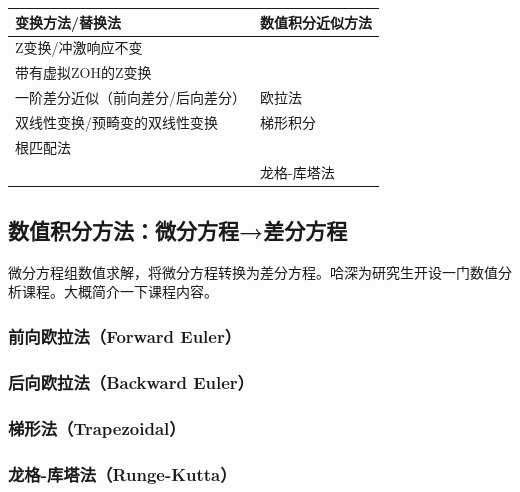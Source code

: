 \documentclass[
  12pt,
  a4paper
]{article}
\begin{document}
\begin{longtable}[]{@{}
  >{\centering\arraybackslash}p{}
  >{\centering\arraybackslash}p{}@{}}
\toprule\noalign{}
\begin{minipage}[b]{\linewidth}\centering
\textbf{变换方法/替换法}
\end{minipage} & \begin{minipage}[b]{\linewidth}\centering
\textbf{数值积分近似方法}
\end{minipage} \\
\midrule\noalign{}
\endhead
\bottomrule\noalign{}
\endlastfoot
Z变换/冲激响应不变 & \\
带有虚拟ZOH的Z变换 & \\
一阶差分近似（前向差分/后向差分） & 欧拉法 \\
双线性变换/预畸变的双线性变换 & 梯形积分 \\
根匹配法 & \\
& 龙格-库塔法 \\
\end{longtable}

\subsection{数值积分方法：微分方程→差分方程}\label{ux6570ux503cux79efux5206ux65b9ux6cd5ux5faeux5206ux65b9ux7a0bux5deeux5206ux65b9ux7a0b}

微分方程组数值求解，将微分方程转换为差分方程。哈深为研究生开设一门数值分析课程。大概简介一下课程内容。

\subsubsection{前向欧拉法（Forward
Euler）}\label{ux524dux5411ux6b27ux62c9ux6cd5forward-euler}

\subsubsection{后向欧拉法（Backward
Euler）}\label{ux540eux5411ux6b27ux62c9ux6cd5backward-euler}

\subsubsection{梯形法（Trapezoidal）}\label{ux68afux5f62ux6cd5trapezoidal}

\subsubsection{龙格-库塔法（Runge-Kutta）}\label{ux9f99ux683c-ux5e93ux5854ux6cd5runge-kutta}
\end{document}
